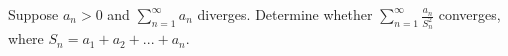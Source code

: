 Suppose $a_n > 0$ and $\displaystyle{ \sum_{n = 1}^\infty a_n }$ diverges.
Determine whether $\displaystyle{ \sum_{n = 1}^\infty \frac{a_n}{S_n^2} }$ converges,
where $S_n = a_1 + a_2 + ... + a_n$.


